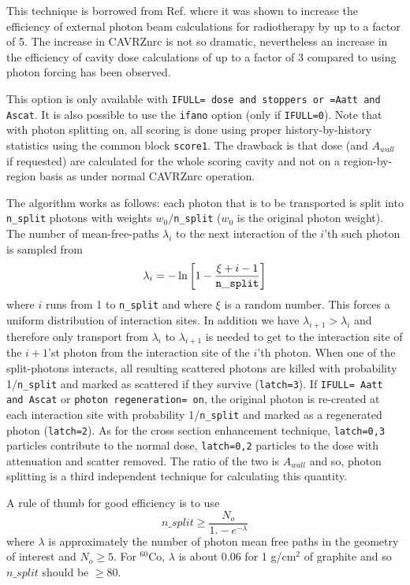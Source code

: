 \documentclass[12pt,twoside]{article}  %
\newcommand{\eqn}[1]{\begin{equation} #1 \end{equation} }
\begin{document}
This technique is borrowed from Ref. \cite{KF99} where it was shown 
to increase the efficiency of external photon beam calculations for 
radiotherapy by up to a factor of 5. The increase in CAVRZnrc is 
not so dramatic, nevertheless an increase in the efficiency 
of cavity dose calculations of up to a factor of 3 compared to using photon
forcing has been observed. 

This option is only available with {\tt IFULL= dose and stoppers or =Aatt and Ascat}. 
It is also possible to use the {\tt ifano} option (only 
if {\tt IFULL=0}). Note that with photon splitting 
on, all scoring
is done using proper history-by-history statistics using
the common block {\tt score1}.  The drawback is that dose
(and $A_{wall}$ if requested) are calculated for the whole scoring cavity and
not on a region-by-region basis as under normal CAVRZnrc operation.

The algorithm works as follows: 
each photon that is to be transported is split into 
{\tt n\_split} photons with weights $w_0/${\tt n\_split} 
($w_0$ is the original photon weight). The number of 
mean-free-paths $\lambda_i$ to the next interaction of the $i$'th 
such photon is sampled from 
\begin{equation}
\lambda_i = -\ln \left[1 - {\xi + i - 1 \over {\tt n\_split} } \right]
\end{equation}
where $i$ runs from 1 to {\tt n\_split} and where $\xi$ is a random 
number. This forces a uniform distribution of interaction sites. 
In addition we have $\lambda_{i+1} > \lambda_i$ and therefore 
only transport from $\lambda_i$ to $\lambda_{i+1}$ is needed to 
get to the interaction site of the $i+1$'st photon from the 
interaction site of the $i$'th photon. When one of the split-photons 
interacts, all resulting scattered photons are killed with probability 
1/{\tt n\_split} and marked as scattered if they survive 
({\tt latch=3}). If {\tt IFULL= Aatt and Ascat} or {\tt photon
regeneration= on}, the original photon is 
re-created at each interaction site with probability  
1/{\tt n\_split} and marked as a regenerated photon ({\tt latch=2}). 
As for the cross section enhancement technique, {\tt latch=0,3} particles 
contribute to the normal dose, {\tt latch=0,2} particles to the dose 
with attenuation and scatter removed. The ratio of the two is 
$A_{wall}$ and so, photon splitting is a third independent 
technique for calculating this quantity.

A rule of thumb for good efficiency is to use
\eqn{n\_split \ge \frac{N_o}{1. - e^{-\lambda}} }
where $\lambda$ is approximately the number of photon mean free paths in the
geometry of interest and $N_o \ge 5$. For $^{60}$Co, $\lambda$ is about
0.06 for 1 g/cm$^2$ of graphite and so $n\_split$ should be $\ge 80$.
\end{document}
